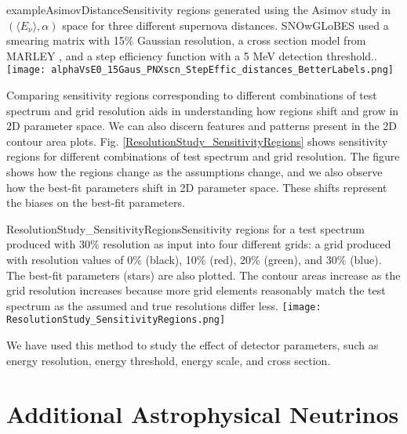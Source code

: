 \begin{dunefigure}{exampleAsimovDistance}{Sensitivity regions generated using the Asimov study in $(\langle E_\nu \rangle, \alpha)$ space for three different supernova distances. SNOwGLoBES used a smearing matrix with 15\% Gaussian resolution, a cross section model from MARLEY \cite{marley}, and a step efficiency function with a 5 MeV detection threshold..}
	\texttt{[image: alphaVsE0\_15Gaus\_PNXscn\_StepEffic\_distances\_BetterLabels.png]}
  \end{dunefigure}




Comparing sensitivity regions corresponding to different combinations of test spectrum and grid resolution aids in understanding how regions shift and grow in 2D parameter space. We can also discern features and patterns present in the 2D contour area plots. Fig. \ref{ResolutionStudy_SensitivityRegions} shows sensitivity regions for different combinations of test spectrum and grid resolution. The figure shows how the regions change as the assumptions change, and we also observe how the best-fit parameters shift in 2D parameter space. These shifts represent the biases on the best-fit parameters.

\begin{dunefigure}{ResolutionStudy_SensitivityRegions}{Sensitivity regions for a test spectrum produced with 30\% resolution as input into four different grids: a grid produced with resolution values of 0\% (black), 10\% (red), 20\% (green), and 30\% (blue). The best-fit parameters (stars) are also plotted. The contour areas increase as the grid resolution increases because more grid elements reasonably match the test spectrum as the assumed and true resolutions differ less.}
	\texttt{[image: ResolutionStudy\_SensitivityRegions.png]}
\end{dunefigure}



We have used this method to study the effect of detector parameters,
such as energy resolution, energy threshold, energy scale, and cross
section.




\section{Additional Astrophysical Neutrinos}
\label{sec:physics-snblowe-other}

